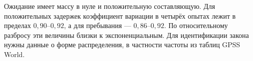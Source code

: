 Ожидание имеет массу в нуле и положительную составляющую. Для
положительных задержек коэффициент вариации в четырёх опытах
лежит в пределах \(0{,}90\)–\(0{,}92\), а для пребывания —
\(0{,}86\)–\(0{,}92\). По относительному разбросу эти величины
близки к экспоненциальным. Для идентификации закона нужны данные
о форме распределения, в частности частоты из таблиц GPSS World.
